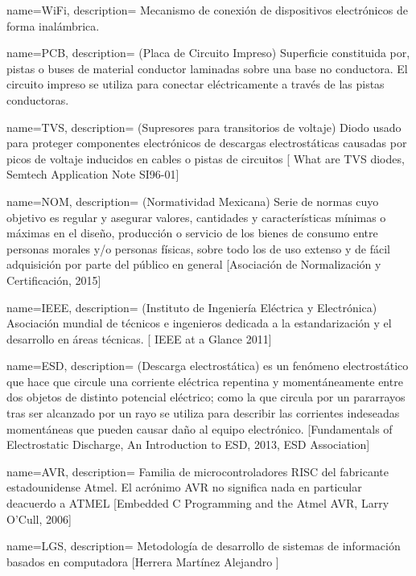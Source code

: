 {
  name=WiFi,
  description={ Mecanismo de conexión de dispositivos electrónicos de forma inalámbrica.}
}

{
  name=PCB,
  description={ (Placa de Circuito Impreso) Superficie constituida por, pistas o buses de material conductor laminadas sobre una base no conductora. El circuito impreso se utiliza para conectar eléctricamente a través de las pistas conductoras.}
}

{
  name=TVS,
  description={ (Supresores para transitorios de voltaje) Diodo usado para proteger componentes electrónicos de descargas electrostáticas causadas por picos de voltaje inducidos en cables o pistas de circuitos [ What are TVS diodes, Semtech Application Note SI96-01] }
}

{
  name=NOM,
  description={ (Normatividad Mexicana) Serie de normas cuyo objetivo es regular y asegurar valores, cantidades y características mínimas o máximas en el diseño, producción o servicio de los bienes de consumo entre personas morales y/o personas físicas, sobre todo los de uso extenso y de fácil adquisición por parte del público en general [Asociación de Normalización y Certificación, 2015] }
}

{
  name=IEEE,
  description={ (Instituto de Ingeniería Eléctrica y Electrónica) Asociación mundial de técnicos e ingenieros dedicada a la estandarización y el desarrollo en áreas técnicas. [ IEEE at a Glance 2011] }
}

{
  name=ESD,
  description={ (Descarga electrostática) es un fenómeno electrostático que hace que circule una corriente eléctrica repentina y momentáneamente entre dos objetos de distinto potencial eléctrico; como la que circula por un pararrayos tras ser alcanzado por un rayo se utiliza para describir las corrientes indeseadas momentáneas que pueden causar daño al equipo electrónico. [Fundamentals of Electrostatic Discharge, An Introduction to ESD, 2013, ESD Association] }
}

{
  name=AVR,
  description={ Familia de microcontroladores RISC del fabricante estadounidense Atmel. El acrónimo AVR no significa nada en particular deacuerdo a ATMEL  [Embedded C Programming and the Atmel AVR, Larry O'Cull, 2006] }
}

{
  name=LGS,
  description={ Metodología de desarrollo de sistemas de información basados en computadora  [Herrera Martínez Alejandro ] }
}

